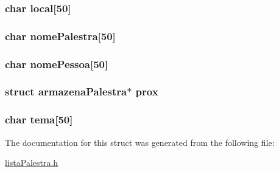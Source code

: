 \subsubsection[{local}]{\setlength{\rightskip}{0pt plus 5cm}char local\mbox{[}50\mbox{]}}\label{structarmazena_palestra_ad0fbc2e59205ea604d8a9bac33ed9473}
\hypertarget{structarmazena_palestra_ae4f7805c01d2a96c7e8abd996cc25a6d}{}
\subsubsection[{nome\+Palestra}]{\setlength{\rightskip}{0pt plus 5cm}char nome\+Palestra\mbox{[}50\mbox{]}}\label{structarmazena_palestra_ae4f7805c01d2a96c7e8abd996cc25a6d}
\hypertarget{structarmazena_palestra_a7e57f32a19542df417023d2b4cff078c}{}
\subsubsection[{nome\+Pessoa}]{\setlength{\rightskip}{0pt plus 5cm}char nome\+Pessoa\mbox{[}50\mbox{]}}\label{structarmazena_palestra_a7e57f32a19542df417023d2b4cff078c}
\hypertarget{structarmazena_palestra_a6a6d4389cfbe251aee591f3c48d17a15}{}
\subsubsection[{prox}]{\setlength{\rightskip}{0pt plus 5cm}struct {\bf armazena\+Palestra}$\ast$ prox}\label{structarmazena_palestra_a6a6d4389cfbe251aee591f3c48d17a15}
\hypertarget{structarmazena_palestra_a8be1f3ec3ae84dc6afee3ab87483612e}{}
\subsubsection[{tema}]{\setlength{\rightskip}{0pt plus 5cm}char tema\mbox{[}50\mbox{]}}\label{structarmazena_palestra_a8be1f3ec3ae84dc6afee3ab87483612e}


The documentation for this struct was generated from the following file\+:\begin{DoxyCompactItemize}
\item 
\hyperlink{lista_palestra_8h}{lista\+Palestra.\+h}\end{DoxyCompactItemize}
